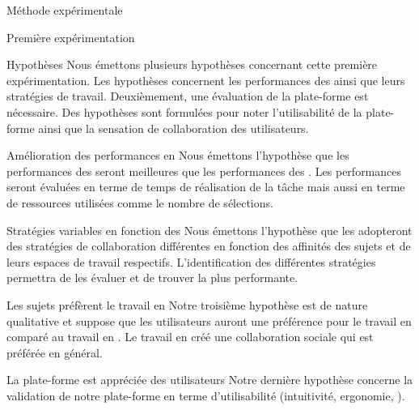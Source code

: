 \documentclass[myfrancais]{mythesis}
\begin{document}
	\begin{mychapter}{Méthode expérimentale}
		\begin{mysection}{Première expérimentation}
			\begin{mysubsection}{Hypothèses}
				Nous émettons plusieurs hypothèses concernant cette première expérimentation.
				Les hypothèses concernent les performances des  ainsi que leurs stratégies de travail.
				Deuxièmement, une évaluation de la plate-forme est nécessaire.
				Des hypothèses sont formulées pour noter l'utilisabilité de la plate-forme ainsi que la sensation de collaboration des utilisateurs.
				\begin{myparagraph}{ Amélioration des performances en }
					Nous émettons l'hypothèse que les performances des  seront meilleures que les performances des .
					Les performances seront évaluées en terme de temps de réalisation de la tâche mais aussi en terme de ressources utilisées comme le nombre de sélections.
				\end{myparagraph}
				\begin{myparagraph}{ Stratégies variables en fonction des }
					Nous émettons l'hypothèse que les  adopteront des stratégies de collaboration différentes en fonction des affinités des sujets et de leurs espaces de travail respectifs.
					L'identification des différentes stratégies permettra de les évaluer et de trouver la plus performante.
				\end{myparagraph}
				\begin{myparagraph}{ Les sujets préfèrent le travail en }
					Notre troisième hypothèse est de nature qualitative et suppose que les utilisateurs auront une préférence pour le travail en  comparé au travail en .
					Le travail en  créé une collaboration sociale qui est préférée en général.
				\end{myparagraph}
				\begin{myparagraph}{ La plate-forme est appréciée des utilisateurs}
					Notre dernière hypothèse concerne la validation de notre plate-forme en terme d'utilisabilité (intuitivité, ergonomie, \myetc).

\end{myparagraph}
\end{mysubsection}
\end{mysection}
\end{mychapter}
\end{document}
